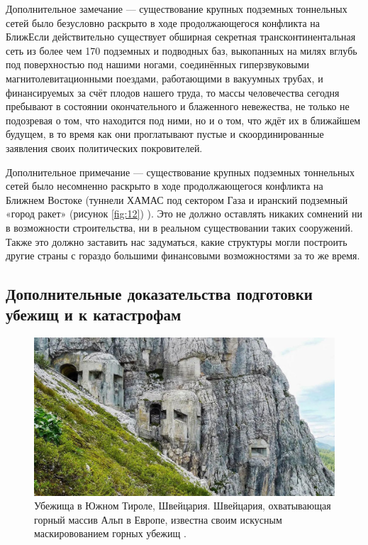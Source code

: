 \documentclass[10pt,twocolumn,letterpaper]{article}
\begin{document}
Дополнительное замечание --- существование крупных подземных тоннельных сетей было безусловно раскрыто в ходе продолжающегося конфликта на БлижЕсли действительно существует обширная секретная трансконтинентальная сеть из более чем 170 подземных и подводных баз, выкопанных на милях вглубь под поверхностью под нашими ногами, соединённых гиперзвуковыми магнитолевитационными поездами, работающими в вакуумных трубах, и финансируемых за счёт плодов нашего труда, то массы человечества сегодня пребывают в состоянии окончательного и блаженного невежества, не только не подозревая о том, что находится под ними, но и о том, что ждёт их в ближайшем будущем, в то время как они проглатывают пустые и скоординированные заявления своих политических покровителей.

Дополнительное примечание --- существование крупных подземных тоннельных сетей было несомненно раскрыто в ходе продолжающегося конфликта на Ближнем Востоке (туннели ХАМАС под сектором Газа \cite{38} и иранский подземный «город ракет» (рисунок \ref{fig:12}) \cite{39,40}). Это не должно оставлять никаких сомнений ни в возможности строительства, ни в реальном существовании таких сооружений. Также это должно заставить нас задуматься, какие структуры могли построить другие страны с гораздо большими финансовыми возможностями за то же время.

\subsection{Дополнительные доказательства подготовки убежищ и к катастрофам}

\begin{figure}[t]
\begin{center}
   \includegraphics[width=1\linewidth]{tyrol.jpg}
\end{center}
   \caption{Убежища в Южном Тироле, Швейцария. Швейцария, охватывающая горный массив Альп в Европе, известна своим искусным маскировованием горных убежищ \cite{32}.}
\label{fig:7}
\label{fig:onecol}
\end{figure}
\end{document}
